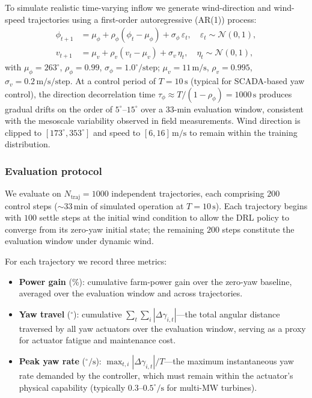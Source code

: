 \documentclass[final,5p,times]{elsarticle}
\begin{document}
To simulate realistic time-varying inflow we generate wind-direction and wind-speed trajectories using a first-order autoregressive (AR(1)) process:
\begin{align}
\phi_{t+1} &= \mu_\phi + \rho_\phi(\phi_t - \mu_\phi) + \sigma_\phi\,\varepsilon_t, \quad \varepsilon_t\sim\mathcal{N}(0,1), \label{eq:ar1_phi}\\
v_{t+1}   &= \mu_v   + \rho_v(v_t - \mu_v)   + \sigma_v\,\eta_t,   \quad \eta_t\sim\mathcal{N}(0,1), \label{eq:ar1_v}
\end{align}
with $\mu_\phi=263^\circ$, $\rho_\phi=0.99$, $\sigma_\phi=1.0^\circ\!/\mathrm{step}$; $\mu_v=11\,\mathrm{m/s}$, $\rho_v=0.995$, $\sigma_v=0.2\,\mathrm{m/s}\!/\mathrm{step}$. At a control period of $T\!=\!10\,\mathrm{s}$ (typical for SCADA-based yaw control), the direction decorrelation time $\tau_\phi\!\approx\!T/(1{-}\rho_\phi)\!=\!1000\,\mathrm{s}$ produces gradual drifts on the order of $5^\circ$--$15^\circ$ over a 33-min evaluation window, consistent with the mesoscale variability observed in field measurements. Wind direction is clipped to $[173^\circ,353^\circ]$ and speed to $[6,16]\,\mathrm{m/s}$ to remain within the training distribution.

\subsubsection{Evaluation protocol}\label{sec:dynamic_protocol}
We evaluate on $N_\mathrm{traj}\!=\!1000$ independent trajectories, each comprising $200$ control steps ($\sim\!33\,\mathrm{min}$ of simulated operation at $T\!=\!10\,\mathrm{s}$). Each trajectory begins with $100$ settle steps at the initial wind condition to allow the DRL policy to converge from its zero-yaw initial state; the remaining $200$ steps constitute the evaluation window under dynamic wind.

For each trajectory we record three metrics:
\begin{itemize}
\item \textbf{Power gain} (\%): cumulative farm-power gain over the zero-yaw baseline, averaged over the evaluation window and across trajectories.
\item \textbf{Yaw travel} ($^\circ$): cumulative $\sum_t\sum_i|\Delta\gamma_{i,t}|$---the total angular distance traversed by all yaw actuators over the evaluation window, serving as a proxy for actuator fatigue and maintenance cost.
\item \textbf{Peak yaw rate} ($^\circ\!/\mathrm{s}$): $\max_{t,i}|\Delta\gamma_{i,t}|/T$---the maximum instantaneous yaw rate demanded by the controller, which must remain within the actuator's physical capability (typically $0.3$--$0.5^\circ\!/\mathrm{s}$ for multi-MW turbines).
\end{itemize}
\end{document}
